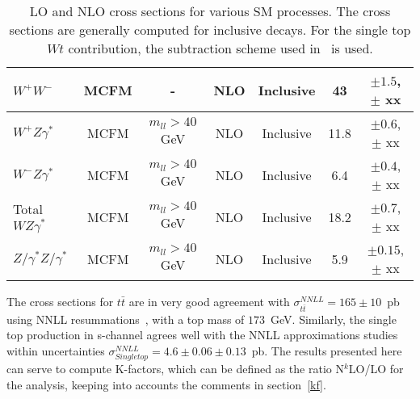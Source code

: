 \begin{table}[hbt]
\begin{center}
\begin{tabular}{|l|c|c|c|c|c|c|}
$W^+W^-$ & MCFM & - & NLO & Inclusive & 43 & $\pm 1.5$, $\pm$ xx \\ \hline
$W^+Z\gamma^*$ & MCFM & $m_{ll} > 40$ GeV & NLO & Inclusive & 11.8 & $\pm 0.6$, $\pm$ xx \\ \hline
$W^-Z\gamma^*$ & MCFM & $m_{ll} > 40$ GeV & NLO & Inclusive & 6.4 & $\pm 0.4$, $\pm$ xx \\ \hline
Total $WZ\gamma^*$ & MCFM & $m_{ll} > 40$ GeV & NLO & Inclusive & 18.2 & $\pm 0.7$, $\pm$ xx \\ \hline
$Z/\gamma^*Z/\gamma^*$ & MCFM & $m_{ll} > 40$ GeV & NLO & Inclusive & 5.9 & $\pm 0.15$, $\pm$ xx \\ \hline
\end{tabular} 
\caption{LO and NLO cross sections for various SM processes. The cross sections are generally
computed for inclusive decays. For the single top $Wt$ contribution, the subtraction scheme
used in~\cite{Wtsubscheme} is used. \label{tab:nlo}}
\end{center}
\end{table}

The cross sections for $t\bar{t}$ are in very good agreement with 
$\sigma^{NNLL}_{t\bar{t}} = 165 \pm 10$~pb using NNLL 
resummations~\cite{nnllttbar}, with a top mass of $173$~GeV. Similarly, the 
single top production in s-channel agrees well with the NNLL approximations 
studies~\cite{nnllschannel} within uncertainties 
$\sigma^{NNLL}_{Single top} = 4.6 \pm 0.06 \pm 0.13$~pb. The results presented 
here can serve to compute K-factors, which can be defined as the ratio 
N$^k$LO/LO for the analysis, keeping into accounts the comments in section~\ref{kf}.
